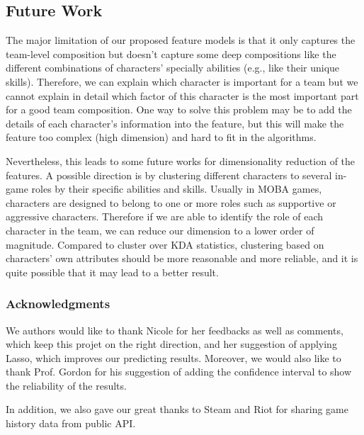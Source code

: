 \documentclass{article} %
\begin{document}
\subsection{Future Work}

The major limitation of our proposed feature models is that it only captures the team-level composition but doesn't capture some deep compositions like the different combinations of characters' specially abilities (e.g., like their unique skills). Therefore, we can explain which character is important for a team but we cannot explain in detail which factor of this character is the most important part for a good team composition. One way to solve this problem may be to add the details of each character's information into the feature, but this will make the feature too complex (high dimension) and hard to fit in the algorithms.

Nevertheless, this leads to some future works for dimensionality reduction of the features. A possible direction is by clustering different characters to several in-game roles by their specific abilities and skills. Usually in MOBA games, characters are designed to belong to one or more roles such as supportive or aggressive characters. Therefore if we are able to identify the role of each character in the team, we can reduce our dimension to a lower order of magnitude. Compared to cluster over KDA statistics, clustering based on characters' own attributes should be more reasonable and more reliable, and it is quite possible that it may lead to a better result.

\subsubsection*{Acknowledgments}

We authors would like to thank Nicole for her feedbacks as well as comments, which keep this projet on the right direction, and her suggestion of applying Lasso, which improves our predicting results. Moreover, we would also like to thank Prof. Gordon for his suggestion of adding the confidence interval to show the reliability of the results.

In addition, we also gave our great thanks to Steam and Riot for sharing game history data from public API.
\end{document}
